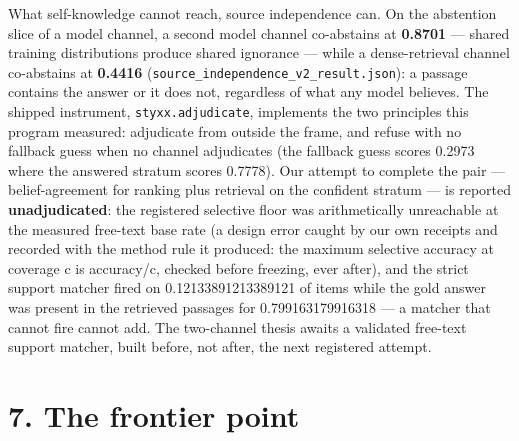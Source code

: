 \documentclass[11pt]{article}
\begin{document}
What self-knowledge cannot reach, source independence can. On the abstention slice of a model channel, a second model channel co-abstains at \textbf{0.8701} --- shared training distributions produce shared ignorance --- while a dense-retrieval channel co-abstains at \textbf{0.4416} (\texttt{source\_independence\_v2\_result.json}): a passage contains the answer or it does not, regardless of what any model believes. The shipped instrument, \texttt{styxx.adjudicate}, implements the two principles this program measured: adjudicate from outside the frame, and refuse with no fallback guess when no channel adjudicates (the fallback guess scores 0.2973 where the answered stratum scores 0.7778). Our attempt to complete the pair --- belief-agreement for ranking plus retrieval on the confident stratum --- is reported \textbf{unadjudicated}: the registered selective floor was arithmetically unreachable at the measured free-text base rate (a design error caught by our own receipts and recorded with the method rule it produced: the maximum selective accuracy at coverage c is accuracy/c, checked before freezing, ever after), and the strict support matcher fired on 0.12133891213389121 of items while the gold answer was present in the retrieved passages for 0.799163179916318 --- a matcher that cannot fire cannot add. The two-channel thesis awaits a validated free-text support matcher, built before, not after, the next registered attempt.

\section{7. The frontier point}\label{7-the-frontier-point}
\end{document}
